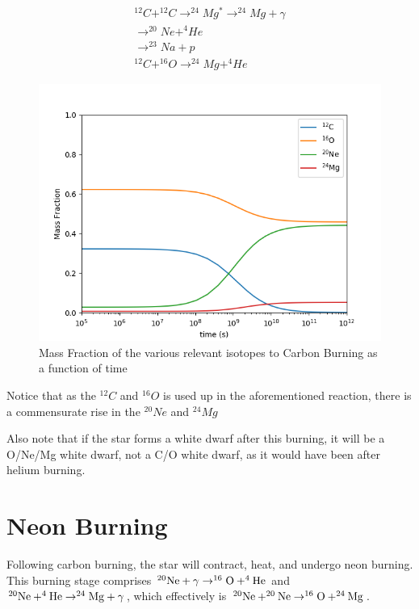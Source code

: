 \documentclass[manuscript]{aastex62}
\begin{document}
\begin{align}
^{12}C + ^{12}C \rightarrow ^{24}Mg^* \rightarrow ^{24}Mg + \gamma \\
\rightarrow ^{20}Ne + ^{4}He \\
\rightarrow ^{23}Na + p \\
^{12}C +^{16}O \rightarrow ^{24}Mg + ^{4}He
\end{align}


\begin{figure}[H]
\centering
\includegraphics[scale=0.7]{task4}
\caption{Mass Fraction of the various relevant isotopes to Carbon Burning as a function of time}
\end{figure}

Notice that as the $^{12}C$ and $^{16}O$ is used up in the aforementioned reaction, there is a commensurate rise in the $^{20}Ne$ and $^{24}Mg$

Also note that if the star forms a white dwarf after this burning,
it will be a O/Ne/Mg white dwarf, not a C/O white dwarf, as it would have
been after helium burning.

\section{Neon Burning} \label{sec:Ne}

Following carbon burning, the star will contract, heat, and undergo neon
burning.  This burning stage comprises $^{20}{\rm Ne} + \gamma \to ^{16}{\rm O}
+ ^4{\rm He}$ and $^{20}{\rm Ne} + ^4{\rm He} \to ^{24}{\rm Mg} + \gamma$,
which effectively is $^{20}{\rm Ne} + ^{20}{\rm Ne} \to ^{16}{\rm O} +
^{24}{\rm Mg}$.
\end{document}
